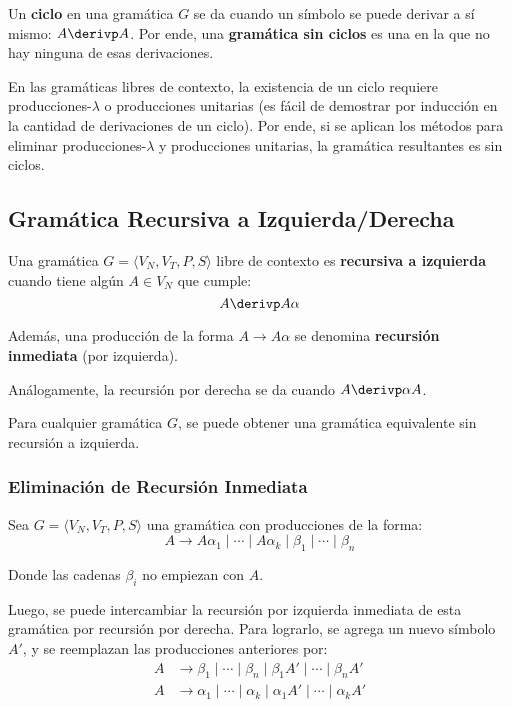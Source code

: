 Un \textbf{ciclo} en una gramática $G$ se da cuando un símbolo se puede derivar a sí mismo: $A \derivp A$. Por ende, una \textbf{gramática sin ciclos} es una en la que no hay ninguna de esas derivaciones.

En las gramáticas libres de contexto, la existencia de un ciclo requiere producciones-$\lambda$ o producciones unitarias (es fácil de demostrar por inducción en la cantidad de derivaciones de un ciclo). Por ende, si se aplican los métodos para eliminar producciones-$\lambda$ y producciones unitarias, la gramática resultantes es sin ciclos.

\subsection{Gramática Recursiva a Izquierda/Derecha}

Una gramática $G = \langle V_N, V_T, P, S \rangle$ libre de contexto es \textbf{recursiva a izquierda} cuando tiene algún $A \in V_N$ que cumple:
$$
    A \derivp A \alpha
$$

Además, una producción de la forma $A \to A \alpha$ se denomina \textbf{recursión inmediata} (por izquierda).

Análogamente, la recursión por derecha se da cuando $A \derivp \alpha A$.

Para cualquier gramática $G$, se puede obtener una gramática equivalente sin recursión a izquierda.

\subsubsection{Eliminación de Recursión Inmediata}

Sea $G = \langle V_N, V_T, P, S \rangle$ una gramática con producciones de la forma:
$$
    A \to A \alpha_1 \mid \cdots \mid A \alpha_k \mid \beta_1 \mid \cdots \mid \beta_n
$$

Donde las cadenas $\beta_i$ no empiezan con $A$.

Luego, se puede intercambiar la recursión por izquierda inmediata de esta gramática por recursión por derecha. Para lograrlo, se agrega un nuevo símbolo $A'$, y se reemplazan las producciones anteriores por:
$$
\begin{aligned}
    A & \to \beta_1 \mid \cdots \mid \beta_n \mid \beta_1 A' \mid \cdots \mid \beta_n A' \\
    A & \to \alpha_1 \mid \cdots \mid \alpha_k \mid \alpha_1 A' \mid \cdots \mid \alpha_k A'
\end{aligned}
$$

